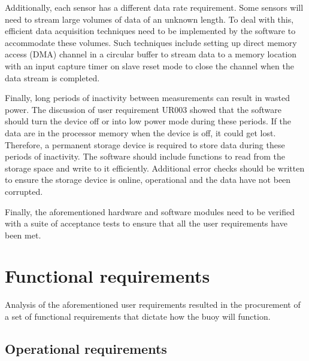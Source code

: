 Additionally, each sensor has a different data rate requirement. Some sensors will need to stream large volumes of data of an unknown length. To deal with this, efficient data acquisition techniques need to be implemented by the software to accommodate these volumes. Such techniques include setting up direct memory access (DMA) channel in a circular buffer to stream data to a memory location with an input capture timer on slave reset mode to close the channel when the data stream is completed.\par 

Finally, long periods of inactivity between measurements can result in wasted power. The discussion of user requirement UR003 showed that the software should turn the device off or into low power mode during these periods. If the data are in the processor memory when the device is off, it could get lost. Therefore, a permanent storage device is required to store data during these periods of inactivity. The software should include functions to read from the storage space and write to it efficiently. Additional error checks should be written to ensure the storage device is online, operational and the data have not been corrupted.

Finally, the aforementioned hardware and software modules need to be verified with a suite of acceptance tests to ensure that all the user requirements have been met. 


\section{Functional requirements}
\label{sec:ch3_FR}
Analysis of the aforementioned user requirements resulted in the procurement of a set of functional requirements that dictate how the buoy will function.

\subsection{Operational requirements }

